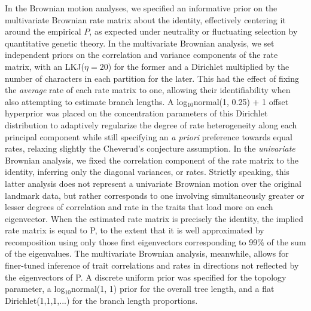 \documentclass[10pt, twocolumn, twoside]{article}
\begin{document}
In the Brownian motion analyses, we specified an informative prior on the multivariate Brownian rate matrix about the identity, effectively centering it around the empirical $P$, as expected under neutrality or fluctuating selection by quantitative genetic theory. In the multivariate Brownian analysis, we set independent priors on the correlation and variance components of the rate matrix, with an LKJ($\eta = 20$) for the former and a Dirichlet multiplied by the number of characters in each partition for the later. This had the effect of fixing the \textit{average} rate of each rate matrix to one, allowing their identifiability when also attempting to estimate branch lengths. A log$_{10}$normal(1, 0.25) + 1 offset hyperprior was placed on the concentration parameters of this Dirichlet distribution to adaptively regularize the degree of rate heterogeneity along each principal component while still specifying an \textit{a priori} preference towards equal rates, relaxing slightly the Cheverud's conjecture assumption. In the \textit{univariate} Brownian analysis, we fixed the correlation component of the rate matrix to the identity, inferring only the diagonal variances, or rates. Strictly speaking, this latter analysis does not represent a univariate Brownian motion over the original landmark data, but rather corresponds to one involving simultaneously greater or lesser degrees of correlation and rate in the traits that load more on each eigenvector. When the estimated rate matrix is precisely the identity, the implied rate matrix is equal to P, to the extent that it is well approximated by recomposition using only those first eigenvectors corresponding to 99\% of the sum of the eigenvalues. The multivariate Brownian analysis, meanwhile, allows for finer-tuned inference of trait correlations and rates in directions not reflected by the eigenvectors of P. A discrete uniform prior was specified for the topology parameter, a log$_{10}$normal(1, 1) prior for the overall tree length, and a flat Dirichlet(1,1,1,...) for the branch length proportions. 

\end{document}

